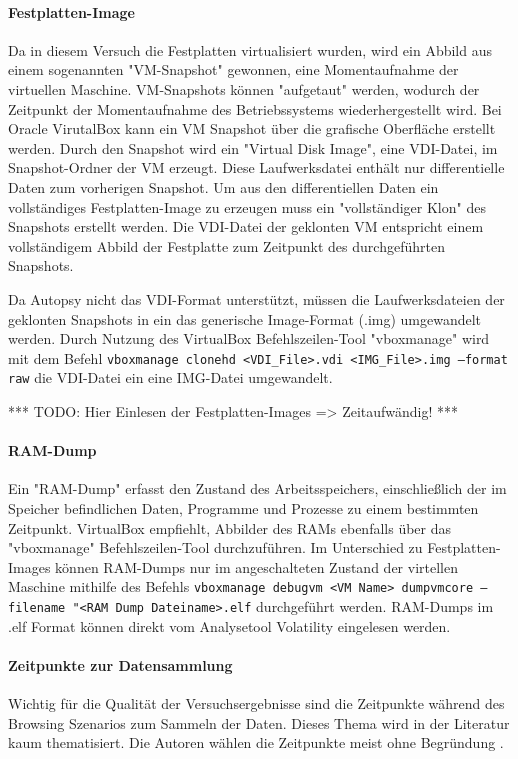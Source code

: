 \paragraph*{Festplatten-Image}
Da in diesem Versuch die Festplatten virtualisiert wurden, wird ein Abbild aus einem sogenannten "VM-Snapshot" gewonnen, eine Momentaufnahme der virtuellen Maschine.  %
VM-Snapshots können "aufgetaut" werden, wodurch der Zeitpunkt der Momentaufnahme des Betriebssystems wiederhergestellt wird.
Bei Oracle VirutalBox kann ein VM Snapshot über die grafische Oberfläche erstellt werden.
Durch den Snapshot wird ein "Virtual Disk Image", eine VDI-Datei, im Snapshot-Ordner der VM erzeugt. Diese Laufwerksdatei enthält nur differentielle Daten zum vorherigen Snapshot.
Um aus den differentiellen Daten ein vollständiges Festplatten-Image zu erzeugen muss ein "vollständiger Klon" des Snapshots erstellt werden. Die VDI-Datei der geklonten VM entspricht einem vollständigem Abbild der Festplatte zum Zeitpunkt des durchgeführten Snapshots.

Da Autopsy nicht das VDI-Format unterstützt, müssen die Laufwerksdateien der geklonten Snapshots in ein das generische Image-Format (.img) umgewandelt werden.
Durch Nutzung des VirtualBox Befehlszeilen-Tool "vboxmanage" wird mit dem Befehl \texttt{vboxmanage clonehd <VDI\_File>.vdi <IMG\_File>.img --format raw} die VDI-Datei ein eine IMG-Datei umgewandelt.

*** TODO: Hier Einlesen der Festplatten-Images => Zeitaufwändig! ***

\paragraph*{RAM-Dump}
Ein "RAM-Dump" erfasst den Zustand des Arbeitsspeichers, einschließlich der im Speicher befindlichen Daten, Programme und Prozesse zu einem bestimmten Zeitpunkt.
VirtualBox empfiehlt, Abbilder des RAMs ebenfalls über das "vboxmanage" Befehlszeilen-Tool durchzuführen.
Im Unterschied zu Festplatten-Images können RAM-Dumps nur im angeschalteten Zustand der virtellen Maschine mithilfe des Befehls \texttt{vboxmanage debugvm <VM Name> dumpvmcore --filename "<RAM Dump Dateiname>.elf} durchgeführt werden. RAM-Dumps im .elf Format können direkt vom Analysetool Volatility eingelesen werden.		

\paragraph*{Zeitpunkte zur Datensammlung}
Wichtig für die Qualität der Versuchsergebnisse sind die Zeitpunkte während des Browsing Szenarios zum Sammeln der Daten.
Dieses Thema wird in der Literatur kaum thematisiert. Die Autoren wählen die Zeitpunkte meist ohne Begründung \cite{Sajan.2021, Nalawade.2016, Montasari.2015, Satvat.2014, Said.2011, Aggarwal.2010}.

